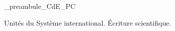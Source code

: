 



\ifdefined\mainIsLoaded\else
\RequirePackage{import}
{_preambule_CdE_PC}

\fi






\debutFicheEntrainement                                                                      %




\begin{prerequis}
Unités du Système international. Écriture scientifique.
\end{prerequis}



